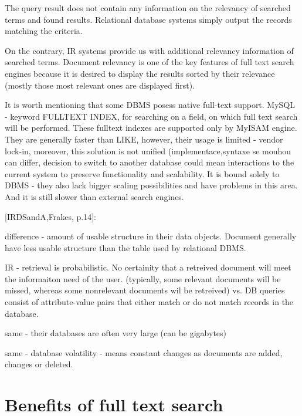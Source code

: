 The query result does not contain any information on the relevancy
of searched terms and found results. Relational database systems simply
output the records matching the criteria.

On the contrary, IR systems provide us with additional relevancy information
of searched terms. Document relevancy is one of the key features of
full text search engines because it is desired to display the results
sorted by their relevance (mostly those most relevant ones are displayed
first).

It is worth mentioning that some DBMS posess native full-text support.
MySQL - keyword FULLTEXT INDEX, for searching on a field, on which full text search will be performed. 
These fulltext indexes are supported only by 
MyISAM engine. They are generally faster than LIKE, however, their usage is limited - vendor lock-in,
moreover, this solution is not unified (implementace,syntaxe se mouhou
can differ, decision to switch to another database could mean interactions to the current system to preserve functionality and scalability. It is bound solely to DBMS - they also lack bigger scaling possibilities and have problems in this area. And it is still slower than external search engines.

{[}IRDSandA,Frakes, p.14{]}:

difference - amount of usable structure in their data objects. Document
generally have less usable structure than the table used by relational
DBMS.

IR - retrieval is probabilistic. No certainity that a retreived document
will meet the informaiton need of the user. (typically, some relevant
documents will be missed, whereas some nonrelevant documents wil be
retreived) vs. DB queries consist of attribute-value pairs that either
match or do not match records in the database.

same - their databases are often very large (can be gigabytes)

same - database volatility - means constant changes as documents are
added, changes or deleted.


\section{Benefits of full text search}

